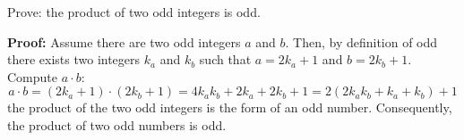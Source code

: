 \begin{questions}

\ifprintanswers
\else
{}





\fi


 Prove: the product of two odd integers is odd. 
    \ifprintanswers
        \vspace{-10pt}
    \fi
\begin{solution} 
\textbf{Proof:} Assume there are two odd integers $a$ and $b$.  Then, by definition of odd there exists two integers $k_a$ and $k_b$ such that $a=2k_a + 1$ and $b=2k_b + 1$.  Compute $a \cdot b$:
    $$ a\cdot b = (2k_a + 1)\cdot(2k_b + 1) = 4k_ak_b + 2k_a + 2k_b + 1 = 2(2k_ak_b + k_a + k_b) + 1$$
    the product of the two odd integers is the form of an odd number.
    Consequently, the product of two odd numbers is odd.
\end{solution}




\end{questions}
